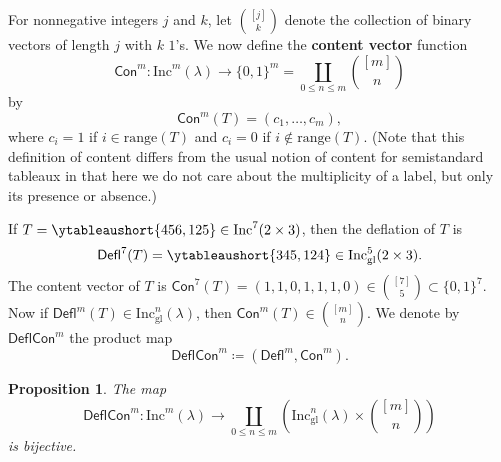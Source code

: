 \documentclass[12pt]{amsart}
\newtheorem{proposition}[theorem]{Proposition}
\theoremstyle{definition}
\newenvironment{example}
  {\pushQED{\qed}\renewcommand{\qedsymbol}{$\diamondsuit$}\examplex}
  {\popQED\endexamplex}
\theoremstyle{remark}
\numberwithin{equation}{section}
\newcommand{\inc}{\ensuremath{\mathrm{Inc}}}
\newcommand{\incgl}{\inc_{\mathrm{gl}}}
\newcommand{\deflate}{\ensuremath{\mathsf{Defl}}}
\newcommand{\content}{\ensuremath{\mathsf{Con}}}
\newcommand{\compress}{\ensuremath{\mathsf{DeflCon}}}
\begin{document}
For nonnegative integers $j$ and $k$, let $\binom{[j]}{k}$ denote the collection of binary vectors of length $j$ with $k$ $1$'s. We now define the {\bf content vector} function 
\[
 \content^m : \inc^m(\lambda) \to \{ 0, 1\}^m = \coprod_{0 \leq  n \leq m} \binom{[m]}{n}
 \] 
 by 
\[
\content^m(T) = (c_1, \dots, c_m),
\] 
where $c_i = 1$ if $i \in \mathrm{range}(T)$ and $c_i = 0$ if $i \notin \mathrm{range}(T)$. (Note that this definition of content differs from the usual notion of content for semistandard tableaux in that here we do not care about the multiplicity of a label, but only its presence or absence.)

\begin{example}\label{ex:deflate}
If $T = \ytableaushort{456,125} \in \inc^7(2 \times 3)$, then the deflation of $T$ is \[\deflate^7(T) = \ytableaushort{345,124} \in \incgl^5(2 \times 3).\] The content vector of $T$ is $\content^7(T) = (1,1,0,1,1,1,0) \in \binom{[7]}{5} \subset \{0,1\}^7$.
\end{example}
Now if $\deflate^m(T) \in \incgl^n(\lambda)$, then $\content^m(T) \in \binom{[m]}{n}$. We denote by $\compress^m$ the product map
\[
\compress^m \coloneqq (\deflate^m,\content^m).
\] 
\begin{proposition}\label{prop:compressbijective} The map 
\[
\compress^m : \inc^m(\lambda) \to \coprod_{0 \leq n \leq m} \left( \incgl^n(\lambda) \times \binom{[m]}{n} \right)
\]
 is bijective.
\end{proposition}
\end{document}

